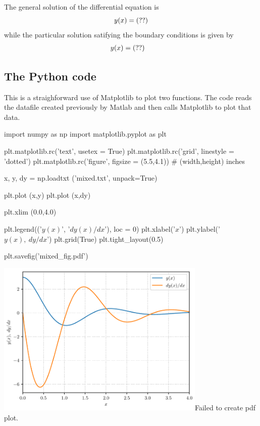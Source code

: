\documentclass[12pt]{article}
\begin{document}
\clearpage

The general solution of the differential equation is
\begin{equation*}
   y(x) = \mat{ans.102}
\end{equation*}
while the particular solution satifying the boundary conditions is given by
\vspace{5pt}
\begin{align*}
   y(x) &= \mat{ans.104}
\end{align*}

\subsection*{The Python code}

This is a straighforward use of Matplotlib to plot two functions. The code reads the datafile created previously by Matlab and then calls Matplotlib to plot that data.

\begin{python}
   import numpy as np
   import matplotlib.pyplot as plt

   plt.matplotlib.rc('text', usetex = True)
   plt.matplotlib.rc('grid', linestyle = 'dotted')
   plt.matplotlib.rc('figure', figsize = (5.5,4.1)) # (width,height) inches

   x, y, dy = np.loadtxt ('mixed.txt', unpack=True)

   plt.plot (x,y)
   plt.plot (x,dy)

   plt.xlim (0.0,4.0)

   plt.legend(('$y(x)$', '$dy(x)/dx$'), loc = 0)
   plt.xlabel('$x$')
   plt.ylabel('$y(x),\> dy/dx$')
   plt.grid(True)
   plt.tight_layout(0.5)

   plt.savefig('mixed_fig.pdf')
\end{python}

\vspace{10pt}

\begin{minipage}{\textwidth}
   \centering
   {\includegraphics[width=0.75\textwidth]{mixed_fig.pdf}}{Failed to create pdf plot.}
\end{minipage}
\end{document}
